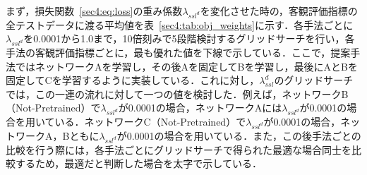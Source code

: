 \documentclass[12pt]{jarticle}
\numberwithin{equation}{section}    %
\numberwithin{figure}{section}      %
\numberwithin{table}{section}      %
\begin{document}
まず，損失関数~\eqref{sec4:eq:loss}の重み係数$\lambda_{ssl^{d}}$を変化させた時の，客観評価指標の全テストデータに渡る平均値を表~\ref{sec4:tab:obj_weights}に示す．各手法ごとに$\lambda_{ssl^{d}}$を0.0001から1.0まで，10倍刻みで5段階検討するグリッドサーチを行い，各手法の客観評価指標ごとに，最も優れた値を下線で示している．ここで，提案手法ではネットワークAを学習し，その後Aを固定してBを学習し，最後にAとBを固定してCを学習するように実装している．これに対し，$\lambda_{ssl}^{d}$のグリッドサーチでは，この一連の流れに対して一つの値を検討した．例えば，ネットワークB（Not-Pretrained）で$\lambda_{ssl^{d}}$が0.0001の場合，ネットワークAには$\lambda_{ssl^{d}}$が0.0001の場合を用いている．ネットワークC（Not-Pretrained）で$\lambda_{ssl^{d}}$が0.0001の場合，ネットワークA，Bともに$\lambda_{ssl^{d}}$が0.0001の場合を用いている．また，この後手法ごとの比較を行う際には，各手法ごとにグリッドサーチで得られた最適な場合同士を比較するため，最適だと判断した場合を太字で示している．
\end{document}
